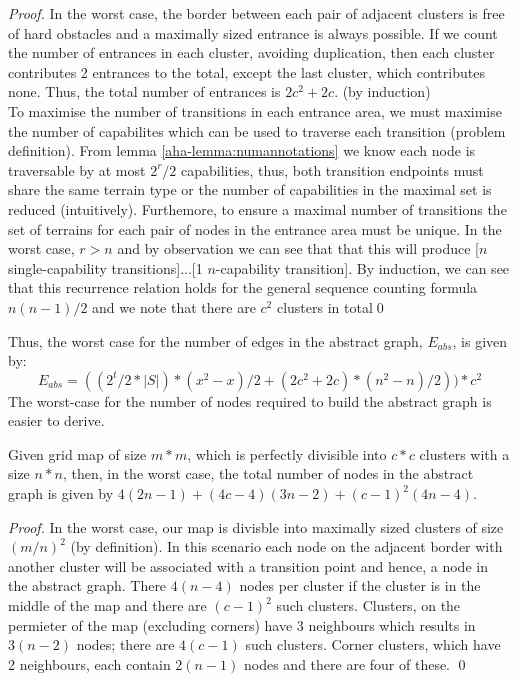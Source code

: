 \begin{proof}
In the worst case, the border between each pair of adjacent clusters is free of hard obstacles and a maximally sized entrance is always possible. If we count the number of entrances in each cluster, avoiding duplication, then each cluster contributes 2 entrances to the total, except the last cluster, which contributes none. Thus, the total number of entrances is $2c^2 + 2c$. (by induction) \\
To maximise the number of transitions in each entrance area, we must maximise the number of capabilites which can be used to traverse each transition (problem definition). From lemma \ref{aha-lemma:numannotations} we know each node is traversable by at most $2^r/2$ capabilities, thus, both transition endpoints must share the same terrain type or the number of capabilities in the maximal set is reduced (intuitively).
Furthemore, to ensure a maximal number of transitions the set of terrains for each pair of nodes in the entrance area must be unique. In the worst case, $r > n$ and by observation we can see that that this will produce [$n$ single-capability transitions]...[1 $n$-capability transition]. By induction, we can see that this recurrence relation holds for the general sequence counting formula $n(n-1)/2$ and we note that there are $c^2$ clusters in total\qed
\end{proof}
Thus, the worst case for the number of edges in the abstract graph, $E_{abs}$, is given by: 
\begin{equation}
\label{aha-eq:maxabstractedges}
E_{abs} = ((2^t/2 * |S|) * (x^2-x)/2 + (2c^2 + 2c)*(n^2-n)/2))*c^2
\end{equation}
The worst-case for the number of nodes required to build the abstract graph is easier to derive. 
\begin{lemma}
\label{aha-lemma:maxnodes}
Given grid map of size $m*m$, which is perfectly divisible into $c*c$ clusters with a size $n*n$, then, in the worst case, the total number of nodes in the abstract graph is given by $4(2n-1) + (4c - 4)(3n-2) + (c-1)^2(4n-4)$.
\end{lemma}

\begin{proof}
In the worst case, our map is divisble into maximally sized clusters of size $(m/n)^2$ (by definition). In this scenario each node on the adjacent border with another cluster will be associated with a transition point and hence, a node in the abstract graph.
There $4(n-4)$ nodes per cluster if the cluster is in the middle of the map and there are $(c-1)^2$ such clusters. Clusters, on the permieter of the map (excluding corners) have 3 neighbours which results in $3(n-2)$ nodes; there are $4(c-1)$ such clusters. Corner clusters, which have 2 neighbours, each contain $2(n-1)$ nodes and there are four of these. \qed
\end{proof}

